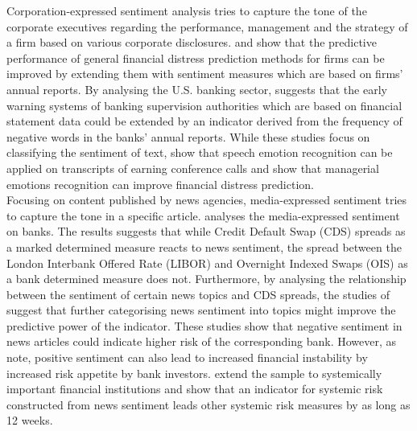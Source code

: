 Corporation-expressed sentiment analysis tries to capture the tone of the corporate executives regarding the performance, management and the strategy of a firm based on various corporate disclosures. \cite{hajek2023} and \cite{huang2023} show that the predictive performance of general financial distress prediction methods for firms can be improved by extending them with sentiment measures which are based on firms' annual reports. By analysing the U.S. banking sector, \cite{gandhi2019} suggests that the early warning systems of banking supervision authorities which are based on financial statement data could be extended by an indicator derived from the frequency of negative words in the banks' annual reports. While these studies focus on classifying the sentiment of text, \cite{hajek2023} show that speech emotion recognition can be applied on transcripts of earning conference calls and show that managerial emotions recognition can improve financial distress prediction. \\

 Focusing on content published by news agencies, media-expressed sentiment tries to capture the tone in a specific article. \cite{smales2016} analyses the media-expressed sentiment on banks. The results suggests that while Credit Default Swap (CDS) spreads as a marked determined measure reacts to news sentiment, the spread between the London Interbank Offered Rate (LIBOR) and Overnight Indexed Swaps (OIS) as a bank determined measure does not. Furthermore, by analysing the relationship between the sentiment of certain news topics and CDS spreads, the studies of \cite{roeder2020} suggest that further categorising news sentiment into topics might improve the predictive power of the indicator. These studies show that negative sentiment in news articles could indicate higher risk of the corresponding bank. However, as \cite{agoraki2022} note, positive sentiment can also lead to increased financial instability by increased risk appetite by bank investors. \cite{borovkova2017} extend the sample to systemically important financial institutions and show that an indicator for systemic risk constructed from news sentiment leads other systemic risk measures by as long as 12 weeks. \\
 
